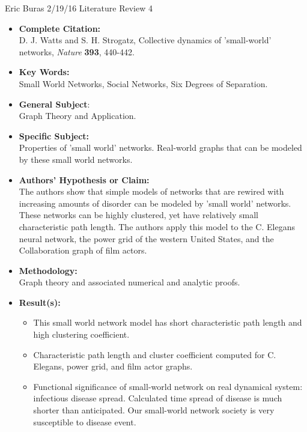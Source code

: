 \documentclass{article}
\begin{document}
Eric Buras 2/19/16 Literature Review 4
\\
\begin{itemize}
\setlength\itemsep{1em}
\item{\textbf{Complete Citation:}}
\\
D. J. Watts and S. H. Strogatz, Collective dynamics of 'small-world' networks, \textit{Nature} \textbf{393}, 440-442.

\item{\textbf{Key Words:}} 
\\
Small World Networks, Social Networks, Six Degrees of Separation.

\item{\textbf{General Subject}:}
\\
Graph Theory and Application.

\item{\textbf{Specific Subject:}}
\\
Properties of 'small world' networks. Real-world graphs that can be modeled by these small world networks.

\item{\textbf{Authors' Hypothesis or Claim:}}
\\
The authors show that simple models of networks that are rewired with increasing amounts of disorder can be modeled by 'small world' networks. These networks can be highly clustered, yet have relatively small characteristic path length. The authors apply this model to the C. Elegans neural network, the power grid of the western United States, and the Collaboration graph of film actors.

\item{\textbf{Methodology:}}
\\
Graph theory and associated numerical and analytic proofs.

\item{\textbf{Result(s):}}
\\
\begin{itemize}
\item
This small world network model has short characteristic path length and high clustering coefficient.
\item
Characteristic path length and cluster coefficient computed for C. Elegans, power grid, and film actor graphs.
\item
Functional significance of small-world network on real dynamical system: infectious disease spread. Calculated time spread of disease is much shorter than anticipated. Our small-world network society is very susceptible to disease event.


\end{itemize}
\end{itemize}
\end{document}
